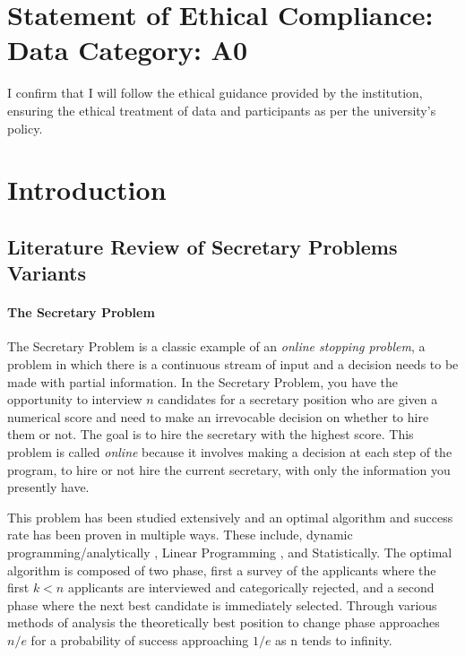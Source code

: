 \documentclass[a4paper,11pt]{article}
\begin{document}
\clearpage





 \section{Statement of Ethical Compliance: Data Category: A0}

I confirm that I will follow the ethical guidance provided by 
the institution, ensuring the ethical
treatment of data and participants as per the university’s policy.

\tableofcontents

    
\section{Introduction}

\subsection{Literature Review of Secretary Problems Variants}

\paragraph{The Secretary Problem} The Secretary Problem is a classic example of an \textit{online stopping problem}, a problem in which there is a continuous stream of input and a decision needs to be made with partial information. In the Secretary Problem, you have the opportunity to interview $n$ candidates for a secretary position who are given a numerical score and need to make an irrevocable decision on whether to hire them or not. The goal is to hire the secretary with the highest score. This problem is called \textit{online} because it involves making a decision at each step of the program, to hire or not hire the current secretary, with only the information you presently have.

This problem has been studied extensively and an optimal algorithm and success rate has been proven in multiple ways. These include, dynamic programming/analytically \cite{bayon2017bestorworstpostdocproblems}, Linear Programming \cite{linearProgramming}, and Statistically\cite{foursidecafe}. The optimal algorithm is composed of two phase, first a survey of the applicants where the first $k < n$ applicants are interviewed and categorically rejected, and a second phase where the next best candidate is immediately selected. Through various methods of analysis the theoretically best position to change phase approaches $n/e$ for a probability of success approaching $1/e$ as n tends to infinity.
\end{document}
